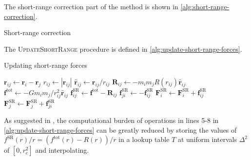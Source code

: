The short-range correction part of the \PThreeM{} method is shown in \autoref{alg:short-range-correction}.
\begin{algorithm}
    \caption{Short-range correction}\label{alg:short-range-correction}
    \begin{algorithmic}[1]
        \Break
        \EndIf
        \State {}
        \EndFor
        \EndFor
        \EndFor
        \EndFor
    \end{algorithmic}
\end{algorithm}
The \textsc{UpdateShortRange} procedure is defined in \autoref{alg:update-short-range-forces}.
\begin{algorithm}
    \caption{Updating short-range forces}\label{alg:update-short-range-forces}
    \begin{algorithmic}[1]
        \Return
        \EndIf
        \State $\mathbf{r}_{ij} \gets \mathbf{r}_i - \mathbf{r}_j$
        \Return
        \EndIf
        \State $r_{ij} \gets |\mathbf{r}_{ij}|$
        \State $\mathbf{\hat{r}}_{ij} \gets \mathbf{r}_{ij} / r_{ij}$
        \State $\mathbf{R}_{ij} \gets -m_i m_j R(r_{ij}) \mathbf{\hat{r}}_{ij}$
        \State $\mathbf{f}^\text{tot} \gets -G m_i m_j / r_{ij}^2 \mathbf{\hat{r}}_{ij}$
        \State $\mathbf{f}^\text{SR}_{ij} \gets \mathbf{f}^\text{tot} - \mathbf{R}_{ij}$
        \State $\mathbf{f}^\text{SR}_{ji} \gets -\mathbf{f}^\text{SR}_{ij}$
        \State $\mathbf{F}^\text{SR}_i \gets \mathbf{F}^\text{SR}_i + \mathbf{f}^\text{SR}_{ij}$
         
        \State $\mathbf{F}^\text{SR}_j \gets \mathbf{F}^\text{SR}_j + \mathbf{f}^\text{SR}_{ji}$
        \EndIf
        \EndProcedure
    \end{algorithmic}
\end{algorithm}
As suggested in \cite{Hockney1988}, the computational burden of operations in lines 5-8 in \autoref{alg:update-short-range-forces} can be greatly reduced by storing the values of $f^\text{SR}(r) / r = (f^\text{tot}(r) - R(r)) / r$ in a lookup table $T$ at uniform intervals $\Delta^2$ of $[0, r_e^2]$ and interpolating.
